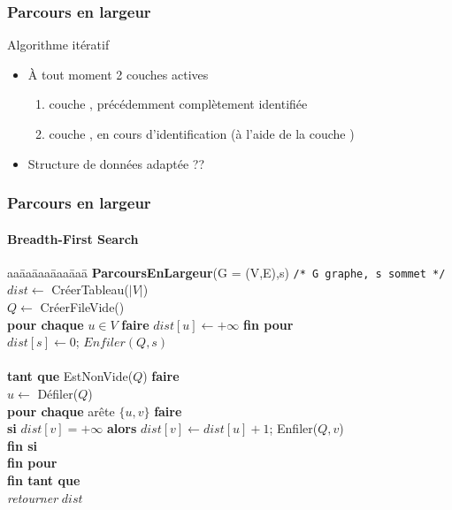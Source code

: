 \begin{frame}
  \frametitle{Parcours en largeur}
Algorithme itératif
\begin{itemize}
\item<1-> À tout moment 2 couches actives 
  \begin{enumerate}
  \item<2-> couche , précédemment complètement identifiée
  \item<3-> couche , en cours d'identification (à l'aide de la couche )
  \end{enumerate}
\item<4-> Structure de données adaptée ?? 
\end{itemize}
\end{frame}
\begin{frame}
  \frametitle{Parcours en largeur}
  \framesubtitle{Breadth-First Search}

  \begin{tabbing}
    aa\=aa\=aaa\=aaa\=aaa\=\kill
    \textbf{ParcoursEnLargeur}(G = (V,E),s) \hfill \texttt{/* G graphe, s sommet */}\\
    \> $dist \leftarrow$ CréerTableau($|V|$) \\
    \> $Q \leftarrow$ CréerFileVide() \\
    \> \textbf{pour chaque} $u \in V$ \textbf{faire} $dist[u] \leftarrow +\infty$ \textbf{fin pour} \\
    \> $dist[s] \leftarrow 0$; $Enfiler(Q,s)$ \\~\\

    \> \textbf{tant que} EstNonVide($Q$) \textbf{faire} \\
    \> \> $u \leftarrow$ Défiler($Q$) \\
    \> \> \textbf{pour chaque} arête $\{u,v\}$ \textbf{faire} \\
    \> \> \> \textbf{si} $dist[v] = +\infty$ \textbf{alors} $dist[v] \leftarrow dist[u]+1$; Enfiler($Q,v$) \\    \> \> \> \textbf{fin si} \\
    \>\> \textbf{fin pour} \\
    \> \textbf{fin tant que} \\
    \> \textsl{retourner} $dist$
  \end{tabbing}
\end{frame}

